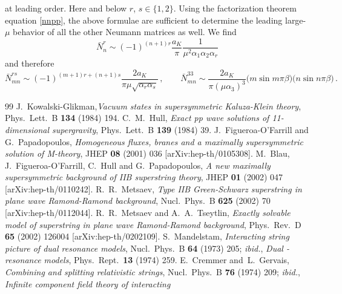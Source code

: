 \documentclass[12pt]{article}
\def\a{\alpha}
\def\b{\beta}
\def\m{\mu}
\numberwithin{equation}{section} \setlength{\textwidth}{17cm}
\begin{document}
at leading order. Here and below $r$, $s\in\{1,2\}$.
Using the factorization theorem equation \eqref{nnpp}, the above formulae are 
sufficient to
determine the leading large-$\m$ behavior of all the other Neumann matrices 
as well. We find
\begin{equation}
\bar{N}^r_n \sim (-1)^{(n+1)r}\frac{a_K}{\pi}\frac{1}{\m^2\a_1\a_2\a_r}
\end{equation}
and therefore
\begin{equation}
\bar{N}^{rs}_{mn} \sim 
(-1)^{(m+1)r+(n+1)s}\frac{2a_K}{\pi\m\sqrt{\a_r\a_s}}\,,
\qquad
\bar{N}^{33}_{mn} \sim \frac{2a_K}{\pi(\m\a_3)^3}\bigl(m\sin m\pi\b\bigr)
\bigl(n\sin n\pi\b\bigr)\,.
\end{equation} 
\begin{thebibliography}{99}
 J.~Kowalski-Glikman,{\em Vacuum states in supersymmetric
Kaluza-Klein theory},
Phys.\ Lett.\ B {\bf 134} (1984) 194.
 C.~M.~Hull, {\em Exact pp wave solutions of 11-dimensional
supergravity},
Phys.\ Lett.\ B {\bf 139} (1984) 39.
 J.~Figueroa-O'Farrill and G.~Papadopoulos,
{\em Homogeneous fluxes, branes and a maximally supersymmetric solution of
M-theory},
JHEP {\bf 08} (2001) 036
[arXiv:hep-th/0105308].
M.~Blau, J.~Figueroa-O'Farrill, C.~Hull and G.~Papadopoulos,
{\em A new maximally supersymmetric background of IIB superstring theory},
JHEP {\bf 01} (2002) 047 [arXiv:hep-th/0110242].
R.~R.~Metsaev,
{\em Type IIB Green-Schwarz superstring in plane wave Ramond-Ramond
background},
Nucl.~Phys.~B {\bf 625} (2002) 70 [arXiv:hep-th/0112044].
R.~R.~Metsaev and A.~A.~Tseytlin,
{\em Exactly solvable model of superstring in plane wave Ramond-Ramond
background},
Phys.~Rev.~D {\bf 65} (2002) 126004 [arXiv:hep-th/0202109].
S.~Mandelstam, {\em Interacting string picture of dual resonance models},
Nucl.\ Phys.\ B {\bf 64} (1973) 205;
{\em ibid.},
{\em Dual - resonance models}, Phys.\ Rept.\  {\bf 13} (1974) 259.
E.~Cremmer and~L.~Gervais, {\em Combining and splitting relativistic
strings},
Nucl.\ Phys.\ B {\bf 76} (1974) 209;
{\em ibid.}, {\em Infinite component field theory of interacting
}
\end{thebibliography}
\end{document}
